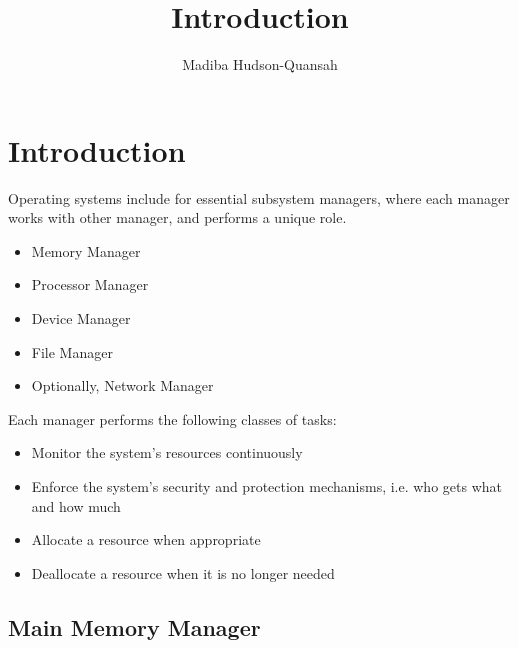 \documentclass[12pt letter]{report}
\title{\Huge{Introduction}}
\author{\huge{Madiba Hudson-Quansah}}
\date{}
\begin{document}
\maketitle
\newpage
{}
\tableofcontents
\pagebreak

\chapter{Introduction}



Operating systems include for essential subsystem managers, where each manager works with other manager, and performs
a unique role.

\begin{itemize}
  \item Memory Manager
  \item Processor Manager
  \item  Device Manager
  \item File Manager
  \item Optionally, Network Manager
\end{itemize}

Each manager performs the following classes of tasks:
\begin{itemize}
  \item Monitor the system's resources continuously
  \item Enforce the system's security and protection mechanisms, i.e. who gets what and how much
  \item Allocate a resource when appropriate
  \item Deallocate a resource when it is no longer needed
\end{itemize}


\section{Main Memory Manager}
\end{document}
